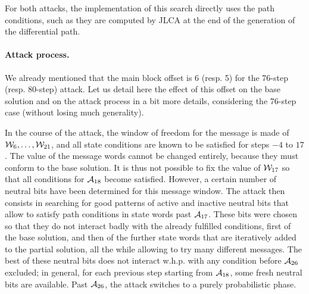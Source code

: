 For both attacks, the implementation of this search directly uses the path conditions, such as they are computed by JLCA at the end of the generation of the differential path.

\paragraph{Attack process.}
We already mentioned that the main block offset is 6 (resp. 5) for the 76-step (resp. 80-step) attack. Let us detail here the effect of this offset on the base solution and on the attack process
in a bit more details, considering the 76-step case (without losing much generality).

In the course of the attack, the window of freedom for the message is made of $\expmess_6,\ldots,\linebreak\expmess_{21}$, and all state conditions are known to be satisfied for steps $-4$ to $17$.
The value of the message words cannot be changed entirely, because they must conform to the base solution. It is thus not possible to \eg fix the value of $\mathcal{W}_{17}$ so that all conditions
for $\mathcal{A}_{18}$ become satisfied. However, a certain number of neutral bits have been determined for this message window. The attack then consists in searching for good patterns of active and
inactive neutral bits that allow to satisfy path conditions in state words past $\mathcal{A}_{17}$. These bits were chosen so that they do not interact badly with the already fulfilled conditions,
first of the base solution, and then of the further state words that are iteratively added to the partial solution, all the while allowing to try many different messages. The best of these neutral bits does not
interact w.h.p. with any condition before $\mathcal{A}_{26}$ excluded; in general, for each previous step starting from $\mathcal{A}_{18}$, some fresh neutral bits are available. Past $\mathcal{A}_{26}$,
the attack switches to a purely probabilistic phase.

